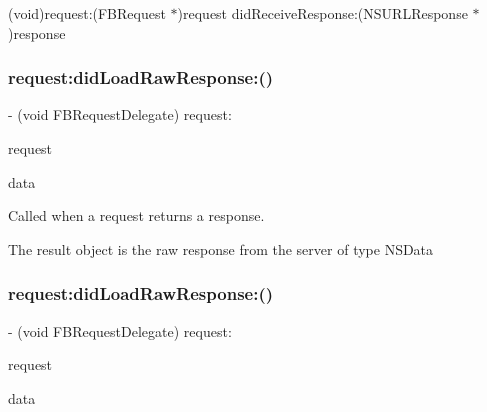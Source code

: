 (void)request\+:(\+F\+B\+Request $\ast$)request did\+Receive\+Response\+:(\+N\+S\+U\+R\+L\+Response $\ast$)response \mbox{\label{protocolFBRequestDelegate_01-p_a9cd54e4077012f956607aa13a887f275}} 
\subsubsection{\texorpdfstring{request\+:did\+Load\+Raw\+Response\+:()}{request:didLoadRawResponse:()}\hspace{0.1cm}{\footnotesize\ttfamily [1/2]}}
{\footnotesize\ttfamily -\/ (void F\+B\+Request\+Delegate) request\+: \begin{DoxyParamCaption}\item[{(\hyperlink{interfaceFBRequest}{F\+B\+Request} $\ast$)}]{request }\item[{didLoadRawResponse:(N\+S\+Data $\ast$)}]{data }\end{DoxyParamCaption}\hspace{0.3cm}{\ttfamily [optional]}}

Called when a request returns a response.

The result object is the raw response from the server of type N\+S\+Data \mbox{\label{protocolFBRequestDelegate_01-p_a9cd54e4077012f956607aa13a887f275}} 
\subsubsection{\texorpdfstring{request\+:did\+Load\+Raw\+Response\+:()}{request:didLoadRawResponse:()}\hspace{0.1cm}{\footnotesize\ttfamily [2/2]}}
{\footnotesize\ttfamily -\/ (void F\+B\+Request\+Delegate) request\+: \begin{DoxyParamCaption}\item[{(\hyperlink{interfaceFBRequest}{F\+B\+Request} $\ast$)}]{request }\item[{didLoadRawResponse:(N\+S\+Data $\ast$)}]{data }\end{DoxyParamCaption}\hspace{0.3cm}{\ttfamily [optional]}}

